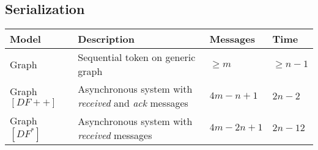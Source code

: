 \subsection{Serialization}
\begin{table}[h]
\begin{tabular}{llll}
			\textbf{Model}		& \textbf{Description}						& \textbf{Messages}						& \textbf{Time} \\
	\hline 	Graph 				& Sequential token on generic graph			& $\geq m$								& $\geq n - 1$ \\
	\hline 	Graph $[DF++]$ 		& Asynchronous system with \emph{received}
	and \emph{ack} messages													& $4m -n + 1$							& $2n - 2$ \\
	\hline 	Graph $[DF^*]$		& Asynchronous system with \emph{received} messages
																			& $4m -2n + 1$								& $2n - 12$ \\
\end{tabular}
\end{table}
